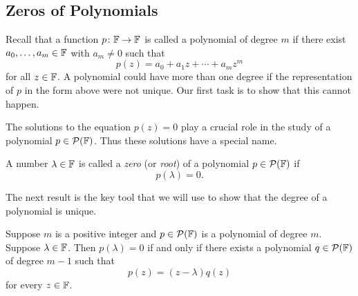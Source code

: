 %

\subsection{Zeros of Polynomials}

Recall that a function $p\colon\mathbb{F}\to\mathbb{F}$ is called a polynomial of degree $m$
if there exist $a_0,\dots,a_m\in\mathbb{F}$ with $a_m\ne0$ such that
\[ p(z) = a_0+a_1z+\cdots+a_mz^m \]
for all $z\in\mathbb{F}$. A polynomial could have more than one degree if the
representation of $p$ in the form above were not unique. Our first task is to
show that this cannot happen.

The solutions to the equation $p(z)=0$ play a crucial role in the study of a
polynomial $p\in\mathcal{P}(\mathbb{F})$. Thus these solutions have a special name.

\begin{definition}\label{ax:4.5}
A number $\lambda\in\mathbb{F}$ is called a \emph{zero} (or \emph{root}) of a
polynomial $p\in\mathcal{P}(\mathbb{F})$ if
\[ p(\lambda)=0. \]
\end{definition}

The next result is the key tool that we will use to show that the degree of a
polynomial is unique.

\begin{result}\label{ax:4.6}
Suppose $m$ is a positive integer and $p\in\mathcal{P}(\mathbb{F})$ is a polynomial of degree
$m$. Suppose $\lambda\in\mathbb{F}$. Then $p(\lambda)=0$ if and only if there exists a
polynomial $q\in\mathcal{P}(\mathbb{F})$ of degree $m-1$ such that
\[ p(z) = (z-\lambda)q(z) \]
for every $z\in\mathbb{F}$.
\end{result}

